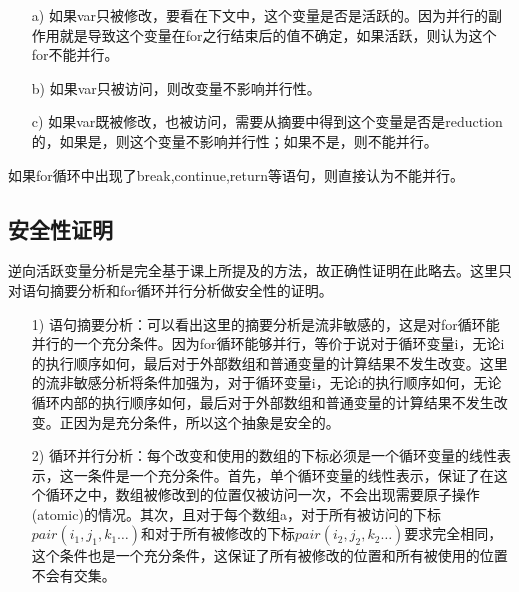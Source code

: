 \documentclass[12pt]{article}
\begin{document}
\begin{itemize}
\begin{description}
							\begin{itemize}
								\item[a)] 如果var只被修改，要看在下文中，这个变量是否是活跃的。因为并行的副作用就是导致这个变量在for之行结束后的值不确定，如果活跃，则认为这个for不能并行。
								\item[b)] 如果var只被访问，则改变量不影响并行性。
								\item[c)] 如果var既被修改，也被访问，需要从摘要中得到这个变量是否是reduction的，如果是，则这个变量不影响并行性；如果不是，则不能并行。
							\end{itemize}
						\item[\text{特殊情况}] 如果for循环中出现了break,continue,return等语句，则直接认为不能并行。
					\end{description}
			\end{itemize}
		\subsection{安全性证明}
			逆向活跃变量分析是完全基于课上所提及的方法，故正确性证明在此略去。这里只对语句摘要分析和for循环并行分析做安全性的证明。\\
			\begin{itemize}
				\item[1)] 语句摘要分析：可以看出这里的摘要分析是流非敏感的，这是对for循环能并行的一个充分条件。因为for循环能够并行，等价于说对于循环变量i，无论i的执行顺序如何，最后对于外部数组和普通变量的计算结果不发生改变。这里的流非敏感分析将条件加强为，对于循环变量i，无论i的执行顺序如何，无论循环内部的执行顺序如何，最后对于外部数组和普通变量的计算结果不发生改变。正因为是充分条件，所以这个抽象是安全的。
				\item[2)] 循环并行分析：每个改变和使用的数组的下标必须是一个循环变量的线性表示，这一条件是一个充分条件。首先，单个循环变量的线性表示，保证了在这个循环之中，数组被修改到的位置仅被访问一次，不会出现需要原子操作(atomic)的情况。其次，且对于每个数组a，对于所有被访问的下标$pair(i_1,j_1,k_1\dots )$和对于所有被修改的下标$pair(i_2,j_2,k_2\dots)$要求完全相同，这个条件也是一个充分条件，这保证了所有被修改的位置和所有被使用的位置不会有交集。
			\end{itemize}
\end{document}
